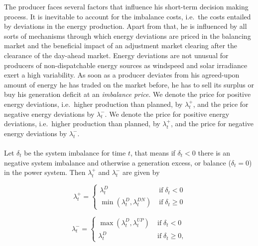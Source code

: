 The producer faces several factors that influence his short-term decision making process. It is inevitable to account for the imbalance costs, i.e.\ the costs entailed by deviations in the energy production. Apart from that, he is influenced by all sorts of mechanisms through which energy deviations are priced in the balancing market and the beneficial impact of an adjustment market clearing after the clearance of the day-ahead market. Energy deviations are not unusual for producers of non-dispatchable energy sources as windspeed and solar irradiance exert a high variability. As soon as a producer deviates from his agreed-upon amount of energy he has traded on the market before, he has to sell its surplus or buy his generation deficit at an \textit{imbalance price}. We denote the price for positive energy deviations, i.e.\ higher production than planned, by $\lambda_{t}^{+}$, and the price for negative energy deviations by $\lambda_{t}^{-}$. 
We denote the price for positive energy deviations, i.e.\ higher production than planned, by $\lambda_{t}^{+}$, and the price for negative energy deviations by $\lambda_{t}^{-}$.
\\ \\
Let $\delta_t$ be the system imbalance for time $t$, that means if $\delta_t<0$ there is an negative system imbalance and otherwise a generation excess, or balance ($\delta_t=0$) in the power system. Then $\lambda_t^+$ and $\lambda_t^-$ are given by 
\begin{figure}[h!]
	\begin{minipage}{0.5\textwidth}
		\begin{equation*}
			\lambda_{t}^+=\begin{cases}
				\lambda_{t}^D &\mathrm{\; if \;} \delta_{t}<0
				\\ \min(\lambda_t^D,\lambda_t^{DN}) &\mathrm{\; if \;} \delta_{t}\ge 0
			\end{cases}
		\end{equation*}
	\end{minipage}
	\hfill
	\begin{minipage}{0.5\textwidth}
		\begin{equation*}
			\lambda_t^-=\begin{cases}
				\max(\lambda_t^D,\lambda_t^{UP}) &\mathrm{\; if \;} \delta_{t}<0
				\\ \lambda_{t}^{D} &\mathrm{\; if \;} \delta_{t}\ge 0,
			\end{cases}
		\end{equation*}
	\end{minipage}
\end{figure}

